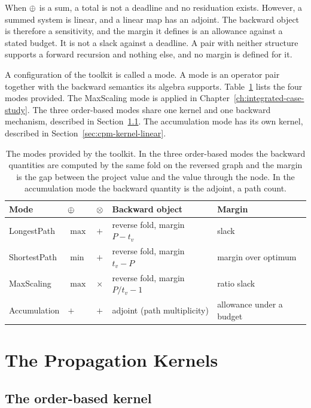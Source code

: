 \documentclass[12pt]{report}
\begin{document}
When $\oplus$ is a sum, a total is not a deadline and no residuation exists. However, a
summed system is linear, and a linear map has an adjoint. The backward object
is therefore a sensitivity, and the margin it defines is an allowance against a stated
budget. It is not a slack against a deadline. A pair with neither structure supports a forward
recursion and nothing else, and no margin is defined for it.

A configuration of the toolkit is called a mode. A mode is an operator pair together with
the backward semantics its algebra supports. Table~\ref{tab:cpm-modes} lists the four
modes provided. The MaxScaling mode is applied in Chapter~\ref{ch:integrated-case-study}. The three order-based modes share one kernel and one backward mechanism,
described in Section~\ref{sec:cpm-kernel-order}. The accumulation mode has its own kernel,
described in Section~\ref{sec:cpm-kernel-linear}.

\begin{table}[htbp]
\centering
\caption{The modes provided by the toolkit. In the three order-based modes the backward
quantities are computed by the same fold on the reversed graph and the margin is the gap
between the project value and the value through the node. In the accumulation mode the
backward quantity is the adjoint, a path count.}
\label{tab:cpm-modes}
\small
\renewcommand{\arraystretch}{1.2}
\begin{tabular}{lllll}
\toprule
Mode & $\oplus$ & $\otimes$ & Backward object & Margin \\
\midrule
LongestPath & $\max$ & $+$ & reverse fold, margin $P - t_v$ & slack \\
ShortestPath & $\min$ & $+$ & reverse fold, margin $t_v - P$ & margin over optimum \\
MaxScaling & $\max$ & $\times$ & reverse fold, margin $P/t_v - 1$ & ratio slack \\
Accumulation & $+$ & $+$ & adjoint (path multiplicity) & allowance under a budget \\
\bottomrule
\end{tabular}
\end{table}

\section{The Propagation Kernels}
\label{sec:cpm-kernels}

\subsection{The order-based kernel}
\label{sec:cpm-kernel-order}
\end{document}
